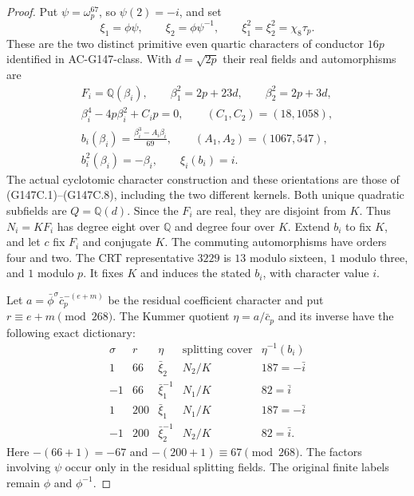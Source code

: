 \begin{proof}
Put $\psi=\omega_p^{67}$, so $\psi(2)=-i$, and set
\[
 \xi_1=\phi\psi,\qquad \xi_2=\phi\psi^{-1},\qquad
 \xi_1^2=\xi_2^2=\chi_8\tau_p.
 \tag{P16Q.3}
\]
These are the two distinct primitive even quartic characters of
conductor $16p$ identified in AC-G147-class.
With $d=\sqrt{2p}$ their real fields and automorphisms are
\[
 \begin{gathered}
 F_i=\mathbb Q(\beta_i),\qquad
 \beta_1^2=2p+23d,\qquad\beta_2^2=2p+3d,\\
 \beta_i^4-4p\beta_i^2+C_i p=0,
       \qquad(C_1,C_2)=(18,1058),\\
 b_i(\beta_i)=\frac{\beta_i^3-A_i\beta_i}{69},
       \qquad(A_1,A_2)=(1067,547),\\
 b_i^2(\beta_i)=-\beta_i,\qquad\xi_i(b_i)=i.
 \end{gathered}
 \tag{P16Q.4}
\]
The actual cyclotomic character construction and these orientations
are those of (G147C.1)--(G147C.8), including the two different kernels.
Both unique quadratic subfields are $Q=\mathbb Q(d)$.
Since the $F_i$ are real, they are disjoint from $K$.
Thus $N_i=KF_i$ has degree eight over $\mathbb Q$ and degree
four over $K$.  Extend $b_i$ to fix $K$, and let $c$ fix $F_i$
and conjugate $K$.  The commuting automorphisms have orders
four and two.  The CRT representative $3229$ is $13$ modulo
sixteen, $1$ modulo three, and $1$ modulo $p$.
It fixes $K$ and induces the stated $b_i$, with character value $i$.

Let $a=\bar\phi^\sigma\bar c_p^{-(e+m)}$ be the residual
coefficient character and put $r\equiv e+m\pmod{268}$.
The Kummer quotient $\eta=a/\bar c_p$ and its inverse have
the following exact dictionary:
\[
 \begin{array}{c|c|c|c|c}
 \sigma&r&\eta&\text{splitting cover}&\eta^{-1}(b_i)\\ \hline
 1&66&\bar\xi_2&N_2/K&187=-\bar i\\
 -1&66&\bar\xi_1^{-1}&N_1/K&82=\bar i\\
 1&200&\bar\xi_1&N_1/K&187=-\bar i\\
 -1&200&\bar\xi_2^{-1}&N_2/K&82=\bar i.
 \end{array}
 \tag{P16Q.5}
\]
Here $-(66+1)=-67$ and $-(200+1)\equiv67\pmod{268}$.
The factors involving $\psi$ occur only in the residual splitting
fields.  The original finite labels remain $\phi$ and $\phi^{-1}$.


\end{proof}
